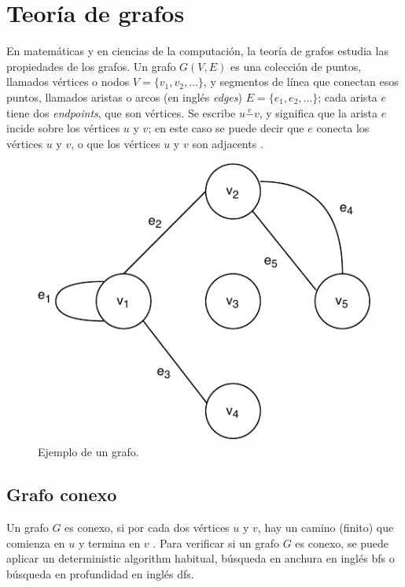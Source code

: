 
\section{Teoría de grafos}\label{graph theory}
En matemáticas y en ciencias de la computación, la teoría de grafos estudia las propiedades de los grafos. Un grafo \( G(V,E) \) es una colección de puntos, llamados vértices o nodos \( V = \{ v_1, v_2, \dots \} \), y segmentos de línea que conectan esos puntos, llamados aristas o arcos (en inglés \textit{edges}) \( E = \{ e_1, e_2, \dots \} \); cada arista \( e \) tiene dos \textit{\gls{endpoints}}, que son vértices. Se escribe \( u \overset{e}{-} v \), y significa que la arista \( e \) incide sobre los vértices \( u \) y \( v \); en este caso se puede decir que \( e \) conecta los vértices \( u \) y \( v \), o que los vértices \( u \) y \( v \) son \gls{adjacents} \cite{even2011graph}.

\begin{figure}[H]
	\centering
	\includegraphics[width=0.35\linewidth]{document/GraphTheory/images/example-of-a-graph}
	\caption{Ejemplo de un grafo. \cite{even2011graph}}
	\label{fig:example-of-a-graph}
\end{figure}

\subsection{Grafo conexo}
Un grafo \( G \) es conexo, si por cada dos vértices \( u \) y \( v \), hay un camino (finito) que comienza en \( u \) y termina en \( v \) \cite{even2011graph}. Para verificar si un grafo \( G \) es conexo, se puede aplicar un \gls{deterministic algorithm} habitual, búsqueda en anchura en inglés \acrfull{bfs} o búsqueda en profundidad en inglés \acrfull{dfs}.

